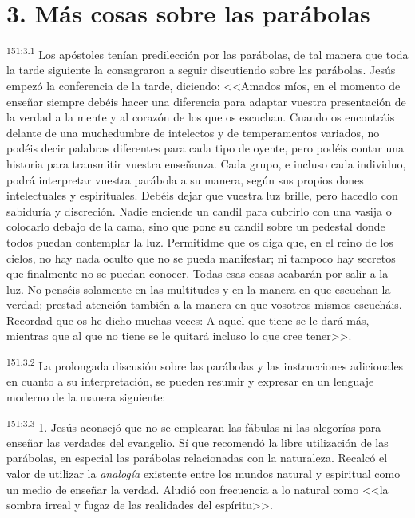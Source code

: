 \section*{3. Más cosas sobre las parábolas}
\par 
\textsuperscript{151:3.1} Los apóstoles tenían predilección por las parábolas, de tal manera que toda la tarde siguiente la consagraron a seguir discutiendo sobre las parábolas. Jesús empezó la conferencia de la tarde, diciendo: <<Amados míos, en el momento de enseñar siempre debéis hacer una diferencia para adaptar vuestra presentación de la verdad a la mente y al corazón de los que os escuchan. Cuando os encontráis delante de una muchedumbre de intelectos y de temperamentos variados, no podéis decir palabras diferentes para cada tipo de oyente, pero podéis contar una historia para transmitir vuestra enseñanza. Cada grupo, e incluso cada individuo, podrá interpretar vuestra parábola a su manera, según sus propios dones intelectuales y espirituales. Debéis dejar que vuestra luz brille, pero hacedlo con sabiduría y discreción. Nadie enciende un candil para cubrirlo con una vasija o colocarlo debajo de la cama, sino que pone su candil sobre un pedestal donde todos puedan contemplar la luz. Permitidme que os diga que, en el reino de los cielos, no hay nada oculto que no se pueda manifestar; ni tampoco hay secretos que finalmente no se puedan conocer. Todas esas cosas acabarán por salir a la luz. No penséis solamente en las multitudes y en la manera en que escuchan la verdad; prestad atención también a la manera en que vosotros mismos escucháis. Recordad que os he dicho muchas veces: A aquel que tiene se le dará más, mientras que al que no tiene se le quitará incluso lo que cree tener>>.

\par 
\textsuperscript{151:3.2} La prolongada discusión sobre las parábolas y las instrucciones adicionales en cuanto a su interpretación, se pueden resumir y expresar en un lenguaje moderno de la manera siguiente:

\par 
\textsuperscript{151:3.3} 1. Jesús aconsejó que no se emplearan las fábulas ni las alegorías para enseñar las verdades del evangelio. Sí que recomendó la libre utilización de las parábolas, en especial las parábolas relacionadas con la naturaleza. Recalcó el valor de utilizar la \textit{analogía} existente entre los mundos natural y espiritual como un medio de enseñar la verdad. Aludió con frecuencia a lo natural como <<la sombra irreal y fugaz de las realidades del espíritu>>.

